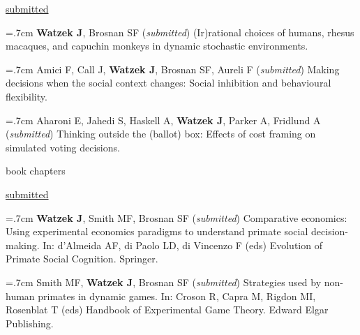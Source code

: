 \documentclass[]{friggeri-cv}
\begin{document}
\hspace{.35cm} { \underline{submitted}}

\hangindent=.7cm \textbf{Watzek J}, Brosnan SF (\emph{submitted}) (Ir)rational choices of humans, rhesus macaques, and capuchin monkeys in dynamic stochastic environments.

\hangindent=.7cm Amici F, Call J, \textbf{Watzek J}, Brosnan SF, Aureli F (\emph{submitted}) Making decisions when the social context changes: Social inhibition and behavioural flexibility.

\hangindent=.7cm Aharoni E, Jahedi S, Haskell A, \textbf{Watzek J}, Parker A, Fridlund A (\emph{submitted}) Thinking outside the (ballot) box: Effects of cost framing on simulated voting decisions. \\[.5cm]



\newpage
\thispagestyle{fancy}



{\subfont\large{} book chapters}


\hspace{.35cm} { \underline{submitted}}

\hangindent=.7cm \textbf{Watzek J}, Smith MF, Brosnan SF (\emph{submitted}) Comparative economics: Using experimental economics paradigms to understand primate social decision-making. In: d'Almeida AF, di Paolo LD, di Vincenzo F (eds) Evolution of Primate Social Cognition. Springer.

\hangindent=.7cm Smith MF, \textbf{Watzek J}, Brosnan SF (\emph{submitted}) Strategies used by non-human primates in dynamic games. In: Croson R, Capra M, Rigdon MI, Rosenblat T (eds) Handbook of Experimental Game Theory. Edward Elgar Publishing.\\[.4cm]


\end{document}
